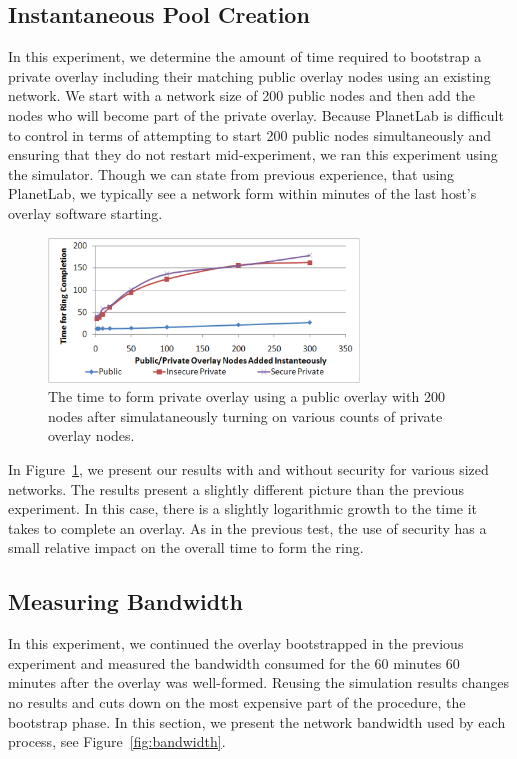 \documentclass[conference]{IEEEtran}
\begin{document}
\subsection{Instantaneous Pool Creation}
\label{mass_join}
In this experiment, we determine the amount of time required to bootstrap a
private overlay including their matching public overlay nodes using an existing
network.  We start with a network size of 200 public nodes and then add the
nodes who will become part of the private overlay.  Because PlanetLab is
difficult to control in terms of attempting to start 200 public nodes
simultaneously and ensuring that they do not restart mid-experiment, we ran
this experiment using the simulator.  Though we can state from previous
experience, that using PlanetLab, we typically see a network form within
minutes of the last host's overlay software starting.

\begin{figure}[h]
\centering
\includegraphics[width=3.25in]{mass_join.eps}
\caption{The time to form private overlay using a public overlay with 200 nodes
after simulataneously turning on various counts of private overlay nodes.}
\label{fig:big_join}
\end{figure}

In Figure~\ref{fig:big_join}, we present our results with and without security
for various sized networks.  The results present a slightly different picture
than the previous experiment.  In this case, there is a slightly logarithmic
growth to the time it takes to complete an overlay.  As in the previous test,
the use of security has a small relative impact on the overall time to
form the ring.

\subsection{Measuring Bandwidth}
In this experiment, we continued the overlay bootstrapped in the previous
experiment and measured the bandwidth consumed for the 60 minutes 60 minutes
after the overlay was well-formed.  Reusing the simulation results changes no
results and cuts down on the most expensive part of the procedure, the bootstrap
phase.  In this section, we present the network bandwidth used by each process, see
Figure~\ref{fig:bandwidth}.
\end{document}
